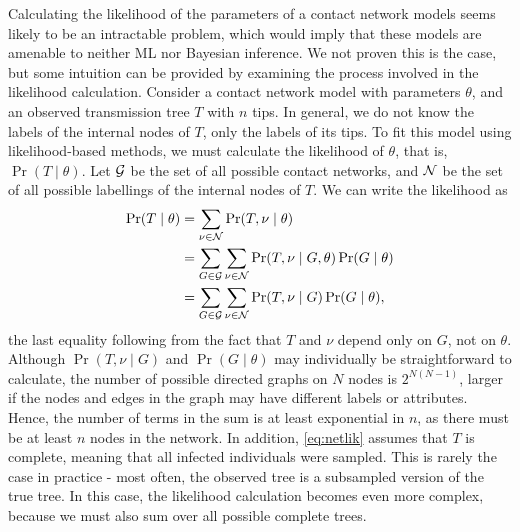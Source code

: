 Calculating the likelihood of the parameters of a contact network models seems
likely to be an intractable problem, which would imply that these models are
amenable to neither \gls{ML} nor Bayesian inference. We not proven this is the
case, but some intuition can be provided by examining the process involved in
the likelihood calculation. Consider a contact network model with parameters
$\theta$, and an observed transmission tree $T$ with $n$ tips.  In general, we
do not know the labels of the internal nodes of $T$, only the labels of its
tips. To fit this model using likelihood-based methods, we must calculate the
likelihood of $\theta$, that is, $\Pr(T \mid \theta)$. Let $\mathcal{G}$ be the set of
all possible contact networks, and $\mathcal{N}$ be the set of all possible labellings
of the internal nodes of $T$. We can write the likelihood as
\begin{align}
\begin{split}
  \label{eq:netlik}
  \Pr(T \mid \theta)
    &= \sum_{\nu \in \mathcal{N}} \Pr(T, \nu \mid \theta) \\
    &= \sum_{G \in \mathcal{G}} \sum_{\nu \in \mathcal{N}} \Pr(T, \nu \mid G, \theta) \Pr(G \mid \theta) \\
    &= \sum_{G \in \mathcal{G}} \sum_{\nu \in \mathcal{N}} \Pr(T, \nu \mid G) \Pr(G \mid \theta),
\end{split}
\end{align}
the last equality following from the fact that $T$ and $\nu$ depend only on
$G$, not on $\theta$. Although $\Pr(T, \nu \mid G)$ and $\Pr(G \mid \theta)$
may individually be straightforward to calculate, the number of possible
directed graphs on $N$ nodes is $2^{N(N-1)}$, larger if the nodes and edges in
the graph may have different labels or attributes. Hence, the number of terms
in the sum is at least exponential in $n$, as there must be at least $n$ nodes
in the network. In addition, \cref{eq:netlik} assumes that $T$ is complete,
meaning that all infected individuals were sampled. This is rarely the case in
practice - most often, the observed tree is a subsampled version of the true
tree. In this case, the likelihood calculation becomes even more complex,
because we must also sum over all possible complete trees.

